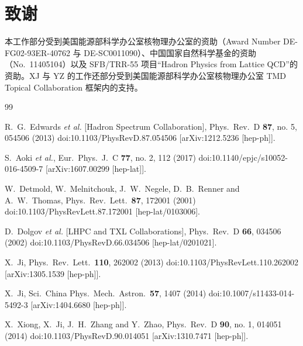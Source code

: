 \section*{致谢}
本工作部分受到美国能源部科学办公室核物理办公室的资助（Award Number DE-FG02-93ER-40762 与 DE-SC0011090）、中国国家自然科学基金的资助（No.~11405104）以及 SFB/TRR-55 项目“Hadron Physics from Lattice QCD”的资助。XJ 与 YZ 的工作还部分受到美国能源部科学办公室核物理办公室 TMD Topical Collaboration 框架内的支持。


\begin{thebibliography}{99}

  R.~G.~Edwards {\it et al.} [Hadron Spectrum Collaboration],
  Phys.\ Rev.\ D {\bf 87}, no. 5, 054506 (2013)
  doi:10.1103/PhysRevD.87.054506
  [arXiv:1212.5236 [hep-ph]].

  S.~Aoki {\it et al.},
  Eur.\ Phys.\ J.\ C {\bf 77}, no. 2, 112 (2017)
  doi:10.1140/epjc/s10052-016-4509-7
  [arXiv:1607.00299 [hep-lat]].


	W.~Detmold, W.~Melnitchouk, J.~W.~Negele, D.~B.~Renner and A.~W.~Thomas,
	Phys.\ Rev.\ Lett.\  {\bf 87}, 172001 (2001)
	doi:10.1103/PhysRevLett.87.172001
	[hep-lat/0103006].


	D.~Dolgov {\it et al.} [LHPC and TXL Collaborations],
	Phys.\ Rev.\ D {\bf 66}, 034506 (2002)
	doi:10.1103/PhysRevD.66.034506
	[hep-lat/0201021].


	X.~Ji,
	Phys.\ Rev.\ Lett.\  {\bf 110}, 262002 (2013)
	doi:10.1103/PhysRevLett.110.262002
	[arXiv:1305.1539 [hep-ph]].


	X.~Ji,
	Sci.\ China Phys.\ Mech.\ Astron.\  {\bf 57}, 1407 (2014)
	doi:10.1007/s11433-014-5492-3
	[arXiv:1404.6680 [hep-ph]].


	X.~Xiong, X.~Ji, J.~H.~Zhang and Y.~Zhao,
	Phys.\ Rev.\ D {\bf 90}, no. 1, 014051 (2014)
	doi:10.1103/PhysRevD.90.014051
	[arXiv:1310.7471 [hep-ph]].


\end{thebibliography}
